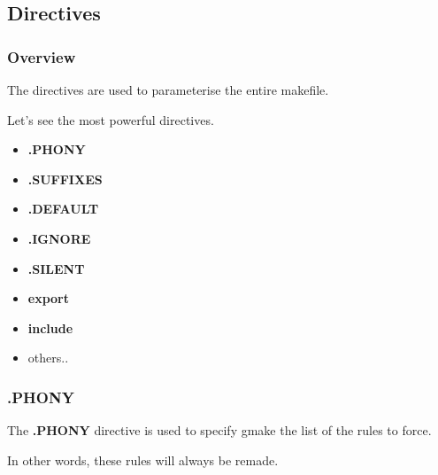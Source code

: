 \documentclass[8pt]{beamer}
\newcommand{\nl}[0]{\vspace{0.4cm}}
\begin{document}
%
%

\subsection{Directives}


\begin{frame}
  \frametitle{Overview}

  The directives are used to parameterise the entire makefile.

  \nl

  Let's see the most powerful directives.

  \begin{itemize}[<+->]
    \item
      \textbf{.PHONY}
    \item
      \textbf{.SUFFIXES}
    \item
      \textbf{.DEFAULT}
    \item
      \textbf{.IGNORE}
    \item
      \textbf{.SILENT}
    \item
      \textbf{export}
    \item
      \textbf{include}
    \item
      others..
  \end{itemize}
\end{frame}


\begin{frame}
  \frametitle{\textbf{.PHONY}}

  The \textbf{.PHONY} directive is used to specify gmake the list of the
  rules to force.

  \nl

  In other words, these rules will always be remade.
\end{frame}


\end{document}
